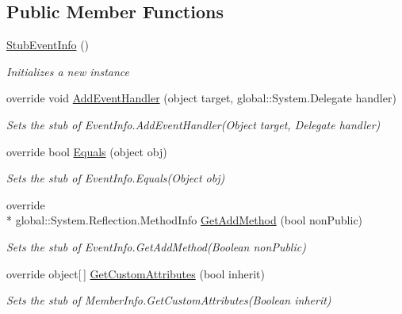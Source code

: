 \subsection*{Public Member Functions}
\begin{DoxyCompactItemize}
\item 
\hyperlink{class_system_1_1_reflection_1_1_fakes_1_1_stub_event_info_a1d81495c4ea4d26b87f4e0f67f9ec7b9}{Stub\-Event\-Info} ()
\begin{DoxyCompactList}\small\item\em Initializes a new instance\end{DoxyCompactList}\item 
override void \hyperlink{class_system_1_1_reflection_1_1_fakes_1_1_stub_event_info_a26ff10f6aeee01b98013d5933346661b}{Add\-Event\-Handler} (object target, global\-::\-System.\-Delegate handler)
\begin{DoxyCompactList}\small\item\em Sets the stub of Event\-Info.\-Add\-Event\-Handler(\-Object target, Delegate handler)\end{DoxyCompactList}\item 
override bool \hyperlink{class_system_1_1_reflection_1_1_fakes_1_1_stub_event_info_a48e665ad96b54fb2d096a2db597a10c4}{Equals} (object obj)
\begin{DoxyCompactList}\small\item\em Sets the stub of Event\-Info.\-Equals(\-Object obj)\end{DoxyCompactList}\item 
override \\*
global\-::\-System.\-Reflection.\-Method\-Info \hyperlink{class_system_1_1_reflection_1_1_fakes_1_1_stub_event_info_a660d2949e7e41e897c89d87c59ff805e}{Get\-Add\-Method} (bool non\-Public)
\begin{DoxyCompactList}\small\item\em Sets the stub of Event\-Info.\-Get\-Add\-Method(\-Boolean non\-Public)\end{DoxyCompactList}\item 
override object\mbox{[}$\,$\mbox{]} \hyperlink{class_system_1_1_reflection_1_1_fakes_1_1_stub_event_info_a5b6dc2bd43653dd7b10a317ebf5b95a5}{Get\-Custom\-Attributes} (bool inherit)
\begin{DoxyCompactList}\small\item\em Sets the stub of Member\-Info.\-Get\-Custom\-Attributes(\-Boolean inherit)\end{DoxyCompactList}\item 

\end{DoxyCompactItemize}
